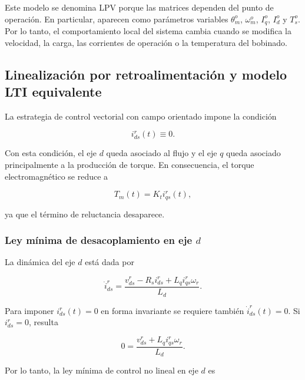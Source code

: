 \documentclass[10pt,a4paper]{article}
\begin{document}
Este modelo se denomina LPV porque las matrices dependen del punto de operación. En particular, aparecen como parámetros variables \(\theta_m^{o}\), \(\omega_m^{o}\), \(I_q^{o}\), \(I_d^{o}\) y \(T_s^{o}\). Por lo tanto, el comportamiento local del sistema cambia cuando se modifica la velocidad, la carga, las corrientes de operación o la temperatura del bobinado.

\subsection{Linealización por retroalimentación y modelo LTI equivalente}

La estrategia de control vectorial con campo orientado impone la condición

\begin{equation}
    i_{ds}^{r}(t)\equiv 0.
    \label{eq:id_cero}
\end{equation}

Con esta condición, el eje \(d\) queda asociado al flujo y el eje \(q\) queda asociado principalmente a la producción de torque. En consecuencia, el torque electromagnético se reduce a

\begin{equation}
    T_m(t)=K_t i_{qs}^{r}(t),
    \label{eq:torque_id_cero}
\end{equation}

ya que el término de reluctancia desaparece.

\subsubsection{Ley mínima de desacoplamiento en eje \(d\)}

La dinámica del eje \(d\) está dada por

\begin{equation}
    \dot{i}_{ds}^{r}
    =
    \frac{
    v_{ds}^{r}
    -
    R_s i_{ds}^{r}
    +
    L_q i_{qs}^{r}\omega_r
    }{L_d}.
    \label{eq:dinamica_d_desacople}
\end{equation}

Para imponer \(i_{ds}^{r}(t)=0\) en forma invariante se requiere también \(\dot{i}_{ds}^{r}(t)=0\). Si \(i_{ds}^{r}=0\), resulta

\begin{equation}
    0=
    \frac{
    v_{ds}^{r}
    +
    L_q i_{qs}^{r}\omega_r
    }{L_d}.
\end{equation}

Por lo tanto, la ley mínima de control no lineal en eje \(d\) es
\end{document}
